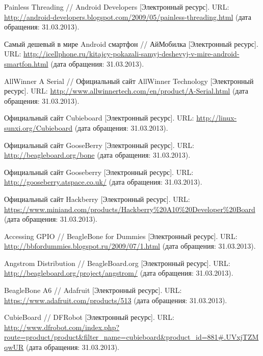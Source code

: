 \begin{thebibliography}{99}
Painless Threading // Android Developers [Электронный ресурс].
URL: \url{http://android-developers.blogspot.com/2009/05/painless-threading.html} (дата обращения: 31.03.2013).

Самый дешевый в мире Android смартфон // АйМобилка [Электронный ресурс].
URL: \url{http://icellphone.ru/kitajcy-pokazali-samyj-deshevyj-v-mire-android-smartfon.html} (дата обращения: 31.03.2013).


AllWinner A Serial // Официальный сайт AllWinner Technology [Электронный ресурс].
URL: \url{http://www.allwinnertech.com/en/product/A-Serial.html} (дата обращения: 31.03.2013).

Официальный сайт Cubieboard [Электронный ресурс].
URL: \url{http://linux-sunxi.org/Cubieboard} (дата обращения: 31.03.2013).

Официальный сайт GooseBerry [Электронный ресурс].
URL: \url{http://beagleboard.org/bone} (дата обращения: 31.03.2013).

Официальный сайт Gooseberry [Электронный ресурс].
URL: \url{http://gooseberry.atspace.co.uk/} (дата обращения: 31.03.2013).

Официальный сайт Hackberry [Электронный ресурс].
URL: \url{https://www.miniand.com/products/Hackberry\%20A10\%20Developer\%20Board} (дата обращения: 31.03.2013).

Accessing GPIO // BeagleBone for Dummies [Электронный ресурс].
URL: \url{http://bbfordummies.blogspot.ru/2009/07/1.html} (дата обращения: 31.03.2013).

Angstrom Distribution // BeagleBoard.org [Электронный ресурс].
URL: \url{http://beagleboard.org/project/angstrom/} (дата обращения: 31.03.2013).

BeagleBone A6 // Adafruit [Электронный ресурс].
URL: \url{https://www.adafruit.com/products/513} (дата обращения: 31.03.2013).

CubieBoard // DFRobot [Электронный ресурс].
URL: \url{http://www.dfrobot.com/index.php?route=product/product&filter_name=cubieboard&product_id=881#.UVxjTZMqwUR} (дата обращения: 31.03.2013).

\end{thebibliography}

\endarticle  %




\clearpage
